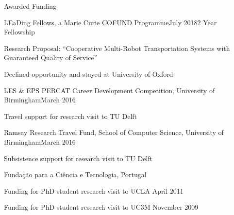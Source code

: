
\begin{rSection}{Awarded Funding}

\begin{rSubsection}{ LEaDing Fellows, a Marie Curie COFUND Programme}{July 2018}{2 Year Fellowship }{}
\item Research Proposal: ``Cooperative Multi-Robot Transportation Systems with Guaranteed Quality of Service''
\item Declined opportunity and stayed at University of Oxford
\end{rSubsection}

\begin{rSubsection}{ LES \& EPS PERCAT Career Development Competition, University of Birmingham}{March 2016}{}{}
\item Travel support for research visit to TU Delft\\
\end{rSubsection}

\begin{rSubsection}{ Ramsay Research Travel Fund, School of Computer Science, University of Birmingham}{March 2016}{}{}
\item Subsistence support for research visit to TU Delft \\
\end{rSubsection}

\begin{rSubsection}{ Funda\c{c}\~{a}o para a Ci\^{e}ncia e Tecnologia, Portugal}{}{}{}
\item Funding for PhD student research visit to UCLA \hfill April 2011\\

\item Funding for PhD student research visit to UC3M \hfill November 2009\\
\end{rSubsection}

\end{rSection}
